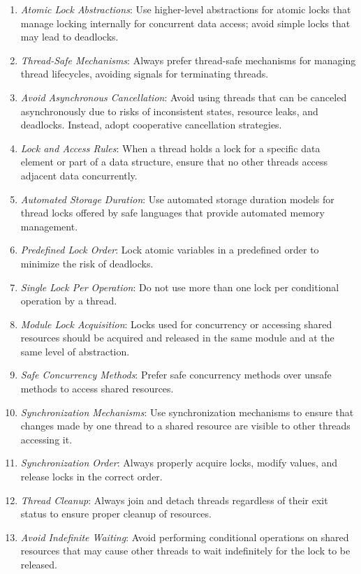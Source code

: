 \documentclass[9pt]{IEEEtran} %
\begin{document}
\begin{enumerate}
  \item \textit{Atomic Lock Abstractions}: Use higher-level abstractions for atomic locks that manage locking internally for concurrent data access; avoid simple locks that may lead to deadlocks.
  \item \textit{Thread-Safe Mechanisms}: Always prefer thread-safe mechanisms for managing thread lifecycles, avoiding signals for terminating threads.
  \item \textit{Avoid Asynchronous Cancellation}: Avoid using threads that can be canceled asynchronously due to risks of inconsistent states, resource leaks, and deadlocks. Instead, adopt cooperative cancellation strategies.
  \item \textit{Lock and Access Rules}: When a thread holds a lock for a specific data element or part of a data structure, ensure that no other threads access adjacent data concurrently.
  \item \textit{Automated Storage Duration}: Use automated storage duration models for thread locks offered by safe languages that provide automated memory management.
  \item \textit{Predefined Lock Order}: Lock atomic variables in a predefined order to minimize the risk of deadlocks.
  \item \textit{Single Lock Per Operation}: Do not use more than one lock per conditional operation by a thread.
  \item \textit{Module Lock Acquisition}: Locks used for concurrency or accessing shared resources should be acquired and released in the same module and at the same level of abstraction.
  \item \textit{Safe Concurrency Methods}: Prefer safe concurrency methods over unsafe methods to access shared resources.
  \item \textit{Synchronization Mechanisms}: Use synchronization mechanisms to ensure that changes made by one thread to a shared resource are visible to other threads accessing it. 
  \item \textit{Synchronization Order}: Always properly acquire locks, modify values, and release locks in the correct order.
  \item \textit{Thread Cleanup}: Always join and detach threads regardless of their exit status to ensure proper cleanup of resources. 
  \item \textit{Avoid Indefinite Waiting}: Avoid performing conditional operations on shared resources that may cause other threads to wait indefinitely for the lock to be released.

\end{enumerate}
\end{document}

